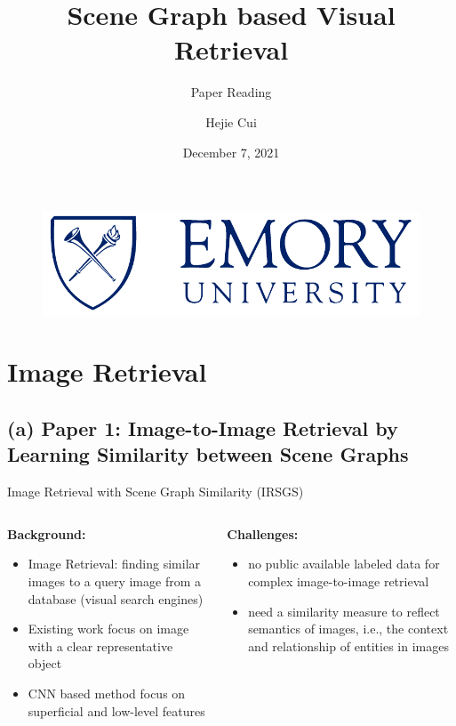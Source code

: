 \documentclass{beamer}
\author{Hejie Cui}
\title{Scene Graph based Visual Retrieval}
\subtitle{Paper Reading}
\institute{Department of Computer Science, Emory University}
\date{December 7, 2021}
\begin{document}
\begin{frame}
    \titlepage
    \begin{figure}[htpb]
        \begin{center}
            \includegraphics[width=0.4\linewidth]{pic/EU_shield_hz_280.pdf}
        \end{center}
    \end{figure}
\end{frame}

\begin{frame}
    \tableofcontents[sectionstyle=show,subsectionstyle=show/shaded/hide,subsubsectionstyle=show/shaded/hide]
\end{frame}

\section{Image Retrieval}


\subsection{(a) Paper 1: Image-to-Image Retrieval by Learning Similarity between Scene Graphs \cite{DBLP:conf/aaai/YoonKJLHPK21}}


\begin{frame}{Image Retrieval with Scene Graph Similarity (IRSGS)}
\begin{columns}
    \begin{column}{0.5\linewidth}
    \textbf{Background:}
        \begin{itemize}
            \item Image Retrieval: finding similar images to a query image from a database (visual search engines)
            \item Existing work focus on image with a clear representative object
            \item CNN based method focus on superficial and low-level features
        \end{itemize}
    \end{column}
    
    \begin{column}{0.5\linewidth}
    \textbf{Challenges:} 
        \begin{itemize}
            \item no public available labeled data for complex image-to-image retrieval
            \item need a similarity measure to reflect semantics of images, i.e., the context and relationship of entities in images
        \end{itemize}
    \end{column}

\end{columns}
\end{frame}
\end{document}
